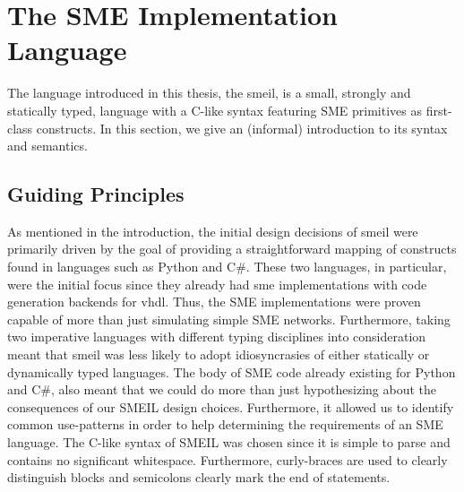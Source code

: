 \chapter{The SME Implementation Language}

The language introduced in this thesis, the \gls{smeil}, is a small, strongly
and statically typed, language with a C-like syntax featuring SME primitives as
first-class constructs.
In this section, we give an (informal) introduction to its syntax and semantics.


\section{Guiding Principles}
As mentioned in the introduction, the initial design decisions of \gls{smeil}
were primarily driven by the goal of providing a straightforward mapping of
constructs found in languages such as Python and C\#. These two languages, in
particular, were the initial focus since they already had \gls{sme}
implementations with code generation backends for \gls{vhdl}. Thus, the SME
implementations were proven capable of more than just simulating simple SME
networks. Furthermore, taking two imperative languages with different typing
disciplines into consideration meant that \gls{smeil} was less likely to adopt
idiosyncrasies of either statically or dynamically typed languages. The body of
SME code already existing for Python and C\#, also meant that we could do more
than just hypothesizing about the consequences of our SMEIL design
choices. Furthermore, it allowed us to identify common use-patterns in order to
help determining the requirements of an SME language. The C-like syntax of SMEIL
was chosen since it is simple to parse and contains no significant
whitespace. Furthermore, curly-braces are used to clearly distinguish blocks and
semicolons clearly mark the end of statements.


